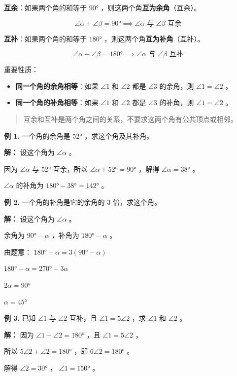 \begin{understand}


\textbf{互余}：如果两个角的和等于 $90°$ ，则这两个角\textbf{互为余角}（互余）。

\[
\angle \alpha + \angle \beta = 90° \implies \angle \alpha \text{ 与 } \angle \beta \text{ 互余}
\]


\textbf{互补}：如果两个角的和等于 $180°$ ，则这两个角\textbf{互为补角}（互补）。

\[
\angle \alpha + \angle \beta = 180° \implies \angle \alpha \text{ 与 } \angle \beta \text{ 互补}
\]


重要性质：
\begin{itemize}
  \item \textbf{同一个角的余角相等}：如果 $\angle 1$ 和 $\angle 2$ 都是 $\angle 3$ 的余角，则 $\angle 1 = \angle 2$ 。
  \item \textbf{同一个角的补角相等}：如果 $\angle 1$ 和 $\angle 2$ 都是 $\angle 3$ 的补角，则 $\angle 1 = \angle 2$ 。
\end{itemize}


\end{understand}

\begin{quote}
互余和互补是两个角之间的关系，不要求这两个角有公共顶点或相邻。
\end{quote}


\begin{workedexamples}


\textbf{例 1.} 一个角的余角是 $52°$ ，求这个角及其补角。

\textbf{解：}
设这个角为 $\angle \alpha$ 。

因为 $\angle \alpha$ 与 $52°$ 互余，所以 $\angle \alpha + 52° = 90°$ ，解得 $\angle \alpha = 38°$ 。

$\angle \alpha$ 的补角为 $180° - 38° = 142°$ 。

\textbf{例 2.} 一个角的补角是它的余角的 $3$ 倍，求这个角。

\textbf{解：}
设这个角为 $\angle \alpha$ 。

余角为 $90° - \alpha$ ，补角为 $180° - \alpha$ 。

由题意： $180° - \alpha = 3(90° - \alpha)$

$180° - \alpha = 270° - 3\alpha$

$2\alpha = 90°$

$\alpha = 45°$

\textbf{例 3.} 已知 $\angle 1$ 与 $\angle 2$ 互补，且 $\angle 1 = 5\angle 2$ ，求 $\angle 1$ 和 $\angle 2$ 。

\textbf{解：}
因为 $\angle 1 + \angle 2 = 180°$ ，且 $\angle 1 = 5\angle 2$ ，

所以 $5\angle 2 + \angle 2 = 180°$ ，即 $6\angle 2 = 180°$ 。

解得 $\angle 2 = 30°$ ， $\angle 1 = 150°$ 。

\end{workedexamples}

